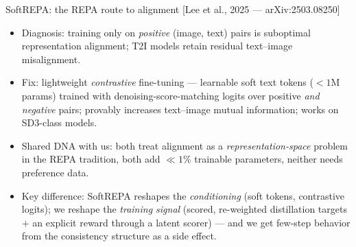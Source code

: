 \documentclass[aspectratio=169,10pt]{beamer}
\newcommand{\litref}[1]{{\scriptsize\color{black!55}[#1]}}
\begin{document}
\begin{frame}{SoftREPA: the REPA route to alignment}
  \litref{Lee et al., 2025 --- arXiv:2503.08250}
  \begin{itemize}
    \item Diagnosis: training only on \emph{positive} (image, text) pairs is
      suboptimal representation alignment; T2I models retain residual
      text--image misalignment.
    \item Fix: lightweight \emph{contrastive} fine-tuning --- learnable soft
      text tokens (${<}1$M params) trained with denoising-score-matching
      logits over positive \emph{and negative} pairs; provably increases
      text--image mutual information; works on SD3-class models.
    \item Shared DNA with us: both treat alignment as a
      \emph{representation-space} problem in the REPA tradition, both add
      ${\ll}1\%$ trainable parameters, neither needs preference data.
    \item Key difference: SoftREPA reshapes the \emph{conditioning} (soft
      tokens, contrastive logits); we reshape the \emph{training signal}
      (scored, re-weighted distillation targets $+$ an explicit reward
      through a latent scorer) --- and we get few-step behavior from the
      consistency structure as a side effect.
  \end{itemize}
\end{frame}
\end{document}
